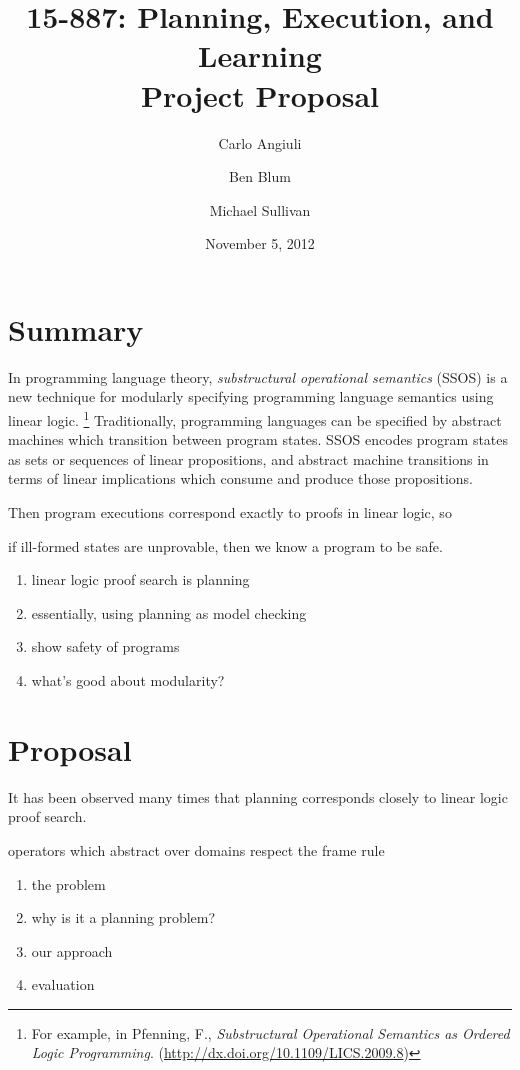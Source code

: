 \documentclass{article}
\title{
{\large 15-887: Planning, Execution, and Learning}\\
Project Proposal}
\author{Carlo Angiuli \and Ben Blum \and Michael Sullivan}
\date{November 5, 2012}
\begin{document}
\maketitle

\section{Summary}

In programming language theory, \emph{substructural operational semantics}
(SSOS) is a new technique for modularly specifying programming language
semantics using linear logic.%
\footnote{For example, in Pfenning, F.,
\textit{Substructural Operational Semantics as Ordered Logic Programming}.
(\url{http://dx.doi.org/10.1109/LICS.2009.8})}
Traditionally, programming languages can be specified by abstract machines which
transition between program states. SSOS encodes program states as sets or
sequences of linear propositions, and abstract machine transitions in terms of
linear implications which consume and produce those propositions.

Then program executions correspond exactly to proofs in linear logic, so 


if
ill-formed states are unprovable, then we know a program to be safe.


\begin{enumerate}
\item linear logic proof search is planning
\item essentially, using planning as model checking
\item show safety of programs
\item what's good about modularity?
\end{enumerate}

\section{Proposal}

It has been observed many times that planning
corresponds closely to linear logic proof search.


operators which abstract over domains
respect the frame rule

\begin{enumerate}
\item the problem
\item why is it a planning problem?
\item our approach
\item evaluation
\end{enumerate}
\end{document}
